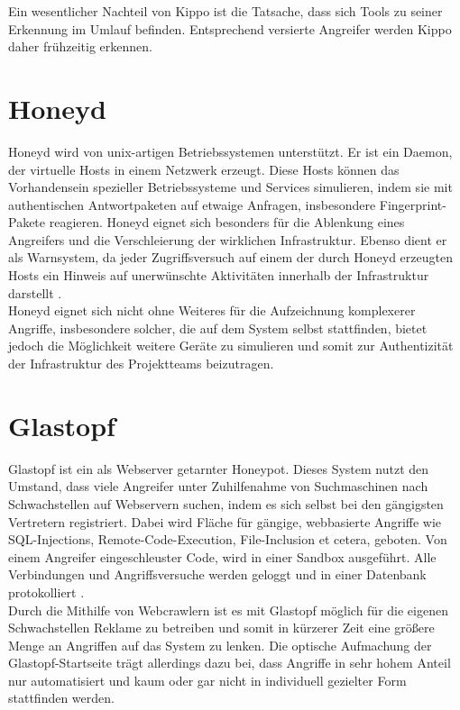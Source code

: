 Ein wesentlicher Nachteil von Kippo ist die Tatsache, dass sich Tools zu seiner Erkennung im Umlauf befinden. Entsprechend versierte Angreifer werden Kippo daher frühzeitig erkennen.

\section{Honeyd}
\label{sec:Honeyd}
Honeyd wird von unix-artigen Betriebssystemen unterstützt. Er ist ein Daemon, der virtuelle Hosts in einem Netzwerk erzeugt. Diese Hosts können das Vorhandensein spezieller Betriebssysteme und Services simulieren, indem sie mit authentischen Antwortpaketen auf etwaige Anfragen, insbesondere Fingerprint-Pakete reagieren. Honeyd eignet sich besonders für die Ablenkung eines Angreifers und die Verschleierung der wirklichen Infrastruktur. Ebenso  dient er als Warnsystem, da jeder Zugriffsversuch auf einem der durch Honeyd erzeugten Hosts ein Hinweis auf unerwünschte Aktivitäten innerhalb der Infrastruktur darstellt \cite{Honeyd16}.\\

Honeyd eignet sich nicht ohne Weiteres für die Aufzeichnung komplexerer Angriffe, insbesondere solcher, die auf dem System selbst stattfinden, bietet jedoch die Möglichkeit weitere Geräte zu simulieren und somit zur Authentizität der Infrastruktur des Projektteams beizutragen.

\section{Glastopf}
\label{sec:Glastopf}

Glastopf ist ein als Webserver getarnter Honeypot. Dieses System nutzt den Umstand, dass viele Angreifer unter Zuhilfenahme von Suchmaschinen nach Schwachstellen auf Webservern suchen, indem es sich selbst bei den gängigsten Vertretern registriert. Dabei wird Fläche für gängige, webbasierte Angriffe wie SQL-Injections, Remote-Code-Execution, File-Inclusion et cetera, geboten. Von einem Angreifer eingeschleuster Code, wird in einer Sandbox ausgeführt. Alle Verbindungen und Angriffsversuche werden geloggt und in einer Datenbank protokolliert \cite{Glastopf16}.\\

Durch die Mithilfe von Webcrawlern ist es mit Glastopf möglich für die eigenen Schwachstellen Reklame zu betreiben und somit in kürzerer Zeit eine größere Menge an Angriffen auf das System zu lenken. Die optische Aufmachung der Glastopf-Startseite trägt allerdings dazu bei, dass Angriffe in sehr hohem Anteil nur automatisiert und kaum oder gar nicht in individuell gezielter Form stattfinden werden.

